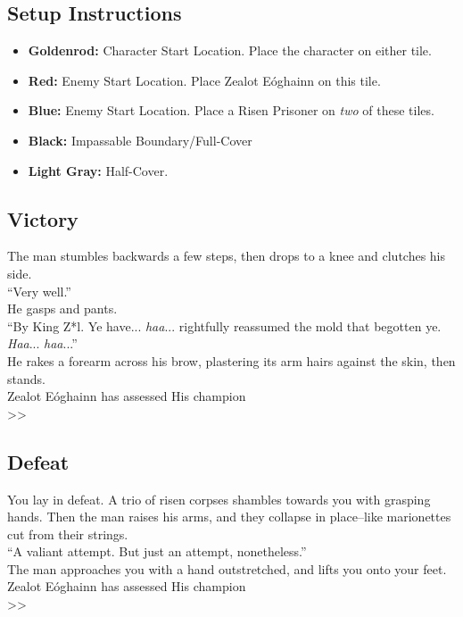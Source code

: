 \subsection*{Setup Instructions}
\begin{itemize}
\item \textbf{Goldenrod:} Character Start Location. Place the character on either tile.
\item \textbf{Red:} Enemy Start Location. Place Zealot Eóghainn on this tile.
\item \textbf{Blue:} Enemy Start Location. Place a Risen Prisoner on \emph{two} of these tiles.
\item \textbf{Black:} Impassable Boundary/Full-Cover
\item \textbf{Light Gray:} Half-Cover.
\end{itemize}

\pagebreak

\subsection*{Victory}
The man stumbles backwards a few steps, then drops to a knee and clutches his side.\\

“Very well.”\\

He gasps and pants.\\
“By King Z*l. Ye have... \emph{haa}... rightfully reassumed the mold that begotten ye. \emph{Haa}... \emph{haa}...”\\

He rakes a forearm across his brow, plastering its arm hairs against the skin, then stands.\\

 Zealot Eóghainn has assessed His champion\\
>> 

\subsection*{Defeat}
You lay in defeat. A trio of risen corpses shambles towards you with grasping hands. Then the man raises his arms, and they collapse in place--like marionettes cut from their strings.\\

“A valiant attempt. But just an attempt, nonetheless.”\\

The man approaches you with a hand outstretched, and lifts you onto your feet.\\

 Zealot Eóghainn has assessed His champion\\
>> 